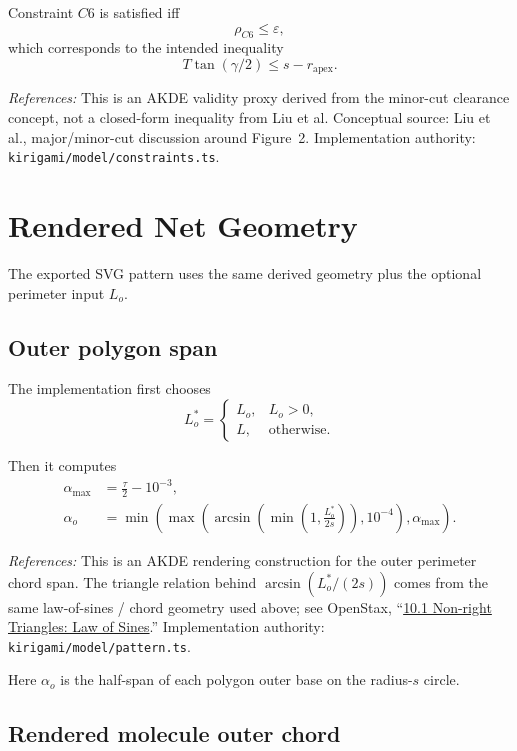 \documentclass[11pt]{article}
\newcommand{\formularefs}[1]{%
\par\smallskip
\noindent\footnotesize\textit{References: }#1
\par\smallskip\normalsize
}
\begin{document}
Constraint $C6$ is satisfied iff
\[
\rho_{C6} \le \varepsilon,
\]
which corresponds to the intended inequality
\[
T\tan(\gamma/2) \le s-r_{\mathrm{apex}}.
\]

\formularefs{This is an AKDE validity proxy derived from the minor-cut clearance concept, not a closed-form inequality from Liu et al. Conceptual source: Liu et al., major/minor-cut discussion around Figure~2. Implementation authority: \texttt{kirigami/model/constraints.ts}.}

\section{Rendered Net Geometry}

The exported SVG pattern uses the same derived geometry plus the optional perimeter
input $L_o$.

\subsection{Outer polygon span}

The implementation first chooses
\[
L_o^\ast =
\begin{cases}
L_o, & L_o>0,\\
L, & \text{otherwise.}
\end{cases}
\]

Then it computes
\begin{align}
\alpha_{\max} &= \frac{\tau}{2} - 10^{-3}, \\
\alpha_o &= \min\!\left(
\max\!\left(
\arcsin\!\left(\min\!\left(1,\frac{L_o^\ast}{2s}\right)\right),
10^{-4}
\right),
\alpha_{\max}
\right).
\end{align}

\formularefs{This is an AKDE rendering construction for the outer perimeter chord span. The triangle relation behind \(\arcsin(L_o^\ast/(2s))\) comes from the same law-of-sines / chord geometry used above; see OpenStax, ``\href{https://openstax.org/books/algebra-and-trigonometry-2e/pages/10-1-non-right-triangles-law-of-sines}{10.1 Non-right Triangles: Law of Sines}.'' Implementation authority: \texttt{kirigami/model/pattern.ts}.}

Here $\alpha_o$ is the half-span of each polygon outer base on the radius-$s$ circle.

\subsection{Rendered molecule outer chord}
\end{document}
